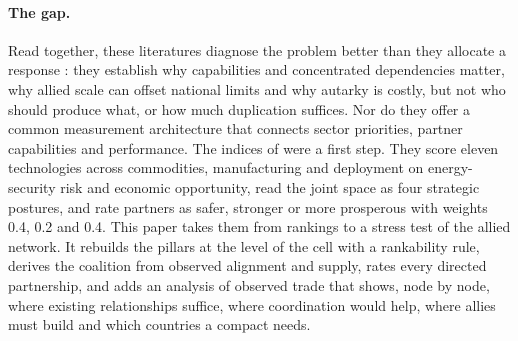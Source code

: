 \paragraph{The gap.} Read together, these literatures diagnose the problem better than they
allocate a response \citep[Section 5]{neis2026allied}: they establish why capabilities and
concentrated dependencies matter, why allied scale can offset national limits and why autarky is
costly, but not who should produce what, or how much duplication suffices. Nor do they offer a
common measurement architecture that connects sector priorities, partner capabilities and
performance. The indices of \citet{carey2025secure} were a
first step. They score eleven technologies across commodities, manufacturing and deployment on
energy-security risk and economic opportunity, read the joint space as four strategic postures,
and rate partners as safer, stronger or more prosperous with weights 0.4, 0.2 and 0.4. This paper
takes them from rankings to a stress test of the allied network. It rebuilds the pillars at the level of the cell with
a rankability rule, derives the coalition from observed alignment and supply, rates every
directed partnership, and adds an analysis of observed trade that shows, node by node, where
existing relationships suffice, where coordination would help, where allies must build and which
countries a compact needs.
